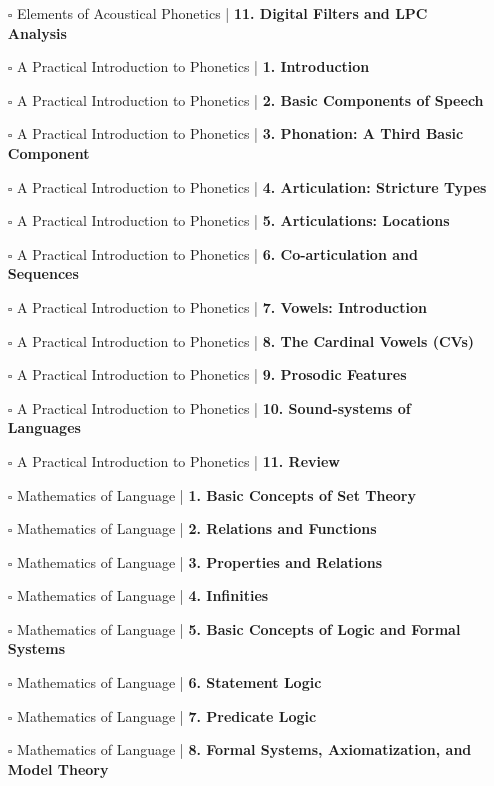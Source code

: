 \documentclass[a4, landscape, 12pt]{article}
\newcommand{\checkbox}{$\square$}%
\begin{document}
\begin{itemize}
{}
\item [\checkbox]  Elements of Acoustical Phonetics | \textbf{ 11. Digital Filters and LPC Analysis
}
\item [\checkbox]  A Practical Introduction to Phonetics | \textbf{ 1. Introduction
}
\item [\checkbox]  A Practical Introduction to Phonetics | \textbf{ 2. Basic Components of Speech
}
\item [\checkbox]  A Practical Introduction to Phonetics | \textbf{ 3. Phonation: A Third Basic Component
}
\item [\checkbox]  A Practical Introduction to Phonetics | \textbf{ 4. Articulation: Stricture Types
}
\item [\checkbox]  A Practical Introduction to Phonetics | \textbf{ 5. Articulations: Locations
}
\item [\checkbox]  A Practical Introduction to Phonetics | \textbf{ 6. Co-articulation and Sequences
}
\item [\checkbox]  A Practical Introduction to Phonetics | \textbf{ 7. Vowels: Introduction
}
\item [\checkbox]  A Practical Introduction to Phonetics | \textbf{ 8. The Cardinal Vowels (CVs)
}
\item [\checkbox]  A Practical Introduction to Phonetics | \textbf{ 9. Prosodic Features
}
\item [\checkbox]  A Practical Introduction to Phonetics | \textbf{ 10. Sound-systems of Languages
}
\item [\checkbox]  A Practical Introduction to Phonetics | \textbf{ 11. Review
}
\item [\checkbox]  Mathematics of Language | \textbf{ 1. Basic Concepts of Set Theory
}
\item [\checkbox]  Mathematics of Language | \textbf{ 2. Relations and Functions
}
\item [\checkbox]  Mathematics of Language | \textbf{ 3. Properties and Relations
}
\item [\checkbox]  Mathematics of Language | \textbf{ 4. Infinities
}
\item [\checkbox]  Mathematics of Language | \textbf{ 5. Basic Concepts of Logic and Formal Systems
}
\item [\checkbox]  Mathematics of Language | \textbf{ 6. Statement Logic
}
\item [\checkbox]  Mathematics of Language | \textbf{ 7. Predicate Logic
}
\item [\checkbox]  Mathematics of Language | \textbf{ 8. Formal Systems, Axiomatization, and Model Theory
}
\end{itemize}
\end{document}
